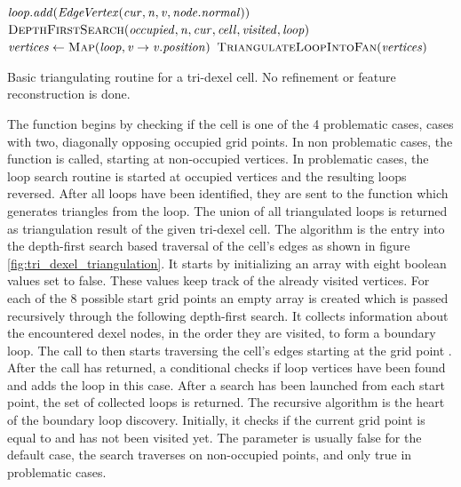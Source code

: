 \begin{algorithm}
\begin{algorithmic}[1]
						\State $\mathit{loop}.\mathit{add}(\mathit{EdgeVertex}(\mathit{cur}, \mathit{n}, \mathit{v}, \mathit{node}.\mathit{normal}))$
					\Else
						\State $\Call{DepthFirstSearch}{\var{occupied}, \var{n}, \var{cur}, \var{cell}, \var{visited}, \var{loop}}$
					\EndIf
				\EndFor
			\EndIf
		\EndFunction
		\\
			\State $\var{vertices} \gets \Call{Map}{\var{loop}, \var{v} \rightarrow \var{v}.\var{position}}$
			\State \Return $\Call{TriangulateLoopIntoFan}{\var{vertices}}$
		\EndFunction
	\end{algorithmic}
	\caption{
		Basic triangulating routine for a tri-dexel cell.
		No refinement or feature reconstruction is done.
	}
	\label{alg:tri_dexel_triangulation}
\end{algorithm}
%
The  function begins by checking if the cell is one of the 4 problematic cases, \ie cases with two, diagonally opposing occupied grid points.
In non problematic cases, the  function is called, starting at non-occupied vertices.
In problematic cases, the loop search routine is started at occupied vertices and the resulting loops reversed.
After all loops have been identified, they are sent to the  function which generates triangles from the loop.
The union of all triangulated loops is returned as triangulation result of the given tri-dexel cell.
%
The  algorithm is the entry into the depth-first search based traversal of the cell's edges as shown in figure \ref{fig:tri_dexel_triangulation}.
It starts by initializing an array with eight boolean values set to false.
These values keep track of the already visited vertices.
For each of the 8 possible start grid points an empty array  is created which is passed recursively through the following depth-first search.
It collects information about the encountered dexel nodes, in the order they are visited, to form a boundary loop.
The call to  then starts traversing the cell's edges starting at the grid point .
After the call has returned, a conditional checks if loop vertices have been found and adds the loop in this case.
After a search has been launched from each start point, the set of collected loops is returned.
%
The recursive  algorithm is the heart of the boundary loop discovery.
Initially, it checks if the current grid point is equal to  and has not been visited yet.
The parameter  is usually false for the default case, \ie the search traverses on non-occupied points, and only true in problematic cases.
